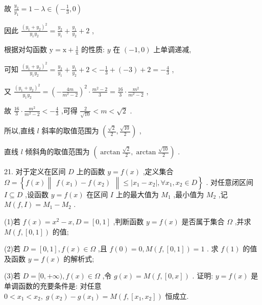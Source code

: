 \documentclass[10pt]{article}
\begin{document}
故 \(\frac{{y}_{2}}{{y}_{1}} = 1 - \lambda  \in  \left( {-\frac{1}{3},0}\right)\)

因此 \(\frac{{\left( {y}_{1} + {y}_{2}\right) }^{2}}{{y}_{1}{y}_{2}} = \frac{{y}_{2}}{{y}_{1}} + \frac{{y}_{1}}{{y}_{2}} + 2\) ,

根据对勾函数 \(\mathrm{y} = \mathrm{x} + \frac{1}{\mathrm{x}}\) 的性质: \(y\) 在 \(\left( {-1,0}\right)\) 上单调递减,

可知 \(\frac{{\left( {y}_{1} + {y}_{2}\right) }^{2}}{{y}_{1}{y}_{2}} = \frac{{y}_{2}}{{y}_{1}} + \frac{{y}_{1}}{{y}_{2}} + 2 <  - \frac{1}{3} + \left( {-3}\right)  + 2 =  - \frac{4}{3}\) ,

又 \(\frac{{\left( {y}_{1} + {y}_{2}\right) }^{2}}{{y}_{1}{y}_{2}} = {\left( -\frac{4m}{{m}^{2} - 2}\right) }^{2} \cdot  \frac{{m}^{2} - 2}{3} = \frac{16}{3} \cdot  \frac{{m}^{2}}{{m}^{2} - 2}\) ,

故 \(\frac{16}{3} \cdot  \frac{{m}^{2}}{{m}^{2} - 2} <  - \frac{4}{3}\) ,可得 \(\frac{2}{\sqrt{10}} < m < \sqrt{2}\) .

所以,直线 \(l\) 斜率的取值范围为 \(\left( {\frac{\sqrt{2}}{2},\frac{\sqrt{10}}{2}}\right)\) ,

直线 \(l\) 倾斜角的取值范围为 \(\left( {\arctan \frac{\sqrt{2}}{2},\arctan \frac{\sqrt{10}}{2}}\right)\) .

21. 对于定义在区间 \(D\) 上的函数 \(y = f\left( x\right)\) ,定义集合 \(\Omega  = \left\{  {f\left( x\right) \begin{Vmatrix}{f\left( {x}_{1}\right)  - f\left( {x}_{2}\right) }\end{Vmatrix} \leq  \left| {{x}_{1} - {x}_{2}}\right| ,\forall {x}_{1},{x}_{2} \in  D}\right\}\) . 对任意闭区间 \(I \subseteq  D\) ,设函数 \(y = f\left( x\right)\) 在区间 \(I\) 上的最大值为 \({M}_{1}\) ,最小值为 \({M}_{2}\) ,记 \(M\left( {f,I}\right)  = {M}_{1} - {M}_{2}\) .

(1)若 \(f\left( x\right)  = {x}^{2} - x,D = \left\lbrack  {0,1}\right\rbrack\) ,判断函数 \(y = f\left( x\right)\) 是否属于集合 \(\Omega\) ,并求 \(M\left( {f,\left\lbrack  {0,1}\right\rbrack  }\right)\) 的值;

(2)若 \(D = \left\lbrack  {0,1}\right\rbrack  ,f\left( x\right)  \in  \Omega\) ,且 \(f\left( 0\right)  = 0,M\left( {f,\left\lbrack  {0,1}\right\rbrack  }\right)  = 1\) . 求 \(f\left( 1\right)\) 的值及函数 \(y = f\left( x\right)\) 的解析式;

(3)若 \(D = \lbrack 0, + \infty ),f\left( x\right)  \in  \Omega\) ,令 \(g\left( x\right)  = M\left( {f,\left\lbrack  {0,x}\right\rbrack  }\right)\) . 证明: \(y = f\left( x\right)\) 是单调函数的充要条件是: 对任意 \(0 < {x}_{1} < {x}_{2},\;g\left( {x}_{2}\right)  - g\left( {x}_{1}\right)  = M\left( {f,\left\lbrack  {{x}_{1},{x}_{2}}\right\rbrack  }\right)\) 恒成立.
\end{document}
